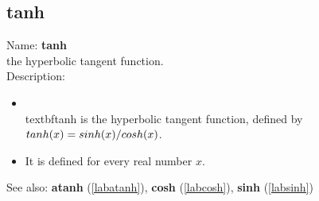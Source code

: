 \subsection{tanh}
\label{labtanh}
\noindent Name: \textbf{tanh}\\
the hyperbolic tangent function.\\
\noindent Description: \begin{itemize}

\item \\textbf{tanh} is the hyperbolic tangent function, defined by $\\tanh(x) = \\sinh(x)/\\cosh(x)$.\n
\item It is defined for every real number $x$.\n\end{itemize}
See also: \textbf{atanh} (\ref{labatanh}), \textbf{cosh} (\ref{labcosh}), \textbf{sinh} (\ref{labsinh})
